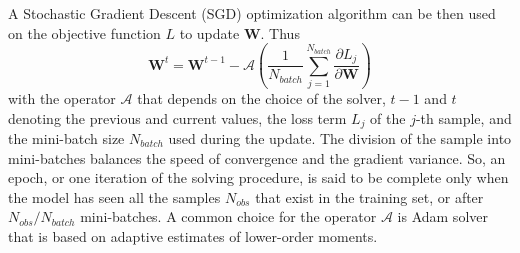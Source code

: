A Stochastic Gradient Descent (SGD) optimization algorithm can be then used on the objective function $ L $ to update $ \textbf{W} $. Thus
\begin{equation}\label{eq-nn-sgd}
\textbf{W}^t=\textbf{W}^{t-1}-\mathcal{A}\left(\frac{1}{N_{batch}}\sum_{j=1}^{N_{batch}}\frac{\partial L_j}{\partial\textbf{W}}\right)
\end{equation}
with the operator $ \mathcal{A} $ that depends on the choice of the solver, $ t-1 $ and $ t $ denoting the previous and current values, the loss term $ L_j $ of the $ j $-th sample, and the mini-batch size $ N_{batch} $ used during the update. The division of the sample into mini-batches balances the speed of convergence and the gradient variance. So, an epoch, or one iteration of the solving procedure, is said to be complete only when the model has seen all the samples $ N_{obs} $ that exist in the training set, or after $ {N_{obs}}/{N_{batch}} $ mini-batches. A common choice for the operator $ \mathcal{A} $ is Adam solver that is based on adaptive estimates of lower-order moments\cite{kingmaAdamMethodStochastic2014}.


